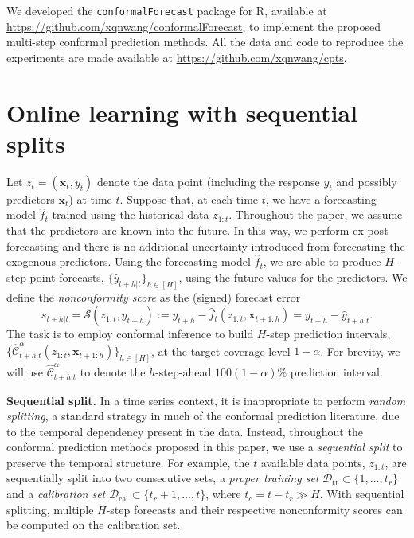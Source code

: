 \documentclass[
  11pt,
  a4paper,
]{article}
\theoremstyle{plain}
\theoremstyle{remark}
\begin{document}
We developed the \texttt{conformalForecast} package for R, available at
\url{https://github.com/xqnwang/conformalForecast}, to implement the
proposed multi-step conformal prediction methods. All the data and code
to reproduce the experiments are made available at
\url{https://github.com/xqnwang/cpts}.

\section{Online learning with sequential splits}\label{sec-setup}

Let \(z_t = (\bm{x}_t, y_t)\) denote the data point (including the
response \(y_t\) and possibly predictors \(\bm{x}_t\)) at time \(t\).
Suppose that, at each time \(t\), we have a forecasting model
\(\hat{f}_t\) trained using the historical data \(z_{1:t}\). Throughout
the paper, we assume that the predictors are known into the future. In
this way, we perform ex-post forecasting and there is no additional
uncertainty introduced from forecasting the exogenous predictors. Using
the forecasting model \(\hat{f}_t\), we are able to produce \(H\)-step
point forecasts, \(\{\hat{y}_{t+h|t}\}_{h\in[H]}\), using the future
values for the predictors. We define the \emph{nonconformity score} as
the (signed) forecast error \[
s_{t+h|t}=\mathcal{S}\left(z_{1:t}, y_{t+h}\right):=y_{t+h}-\hat{f}_t\left(z_{1:t},\bm{x}_{t+1:h}\right)=y_{t+h}-\hat{y}_{t+h|t}.
\] The task is to employ conformal inference to build \(H\)-step
prediction intervals,
\(\{\hat{\mathcal{C}}_{t+h|t}^{\alpha}\left(z_{1:t},\bm{x}_{t+1:h}\right)\}_{h\in[H]}\),
at the target coverage level \(1-\alpha\). For brevity, we will use
\(\hat{\mathcal{C}}_{t+h|t}^{\alpha}\) to denote the \(h\)-step-ahead
\(100(1-\alpha)\%\) prediction interval.

\textbf{Sequential split.} In a time series context, it is inappropriate
to perform \emph{random splitting}, a standard strategy in much of the
conformal prediction literature, due to the temporal dependency present
in the data. Instead, throughout the conformal prediction methods
proposed in this paper, we use a \emph{sequential split} to preserve the
temporal structure. For example, the \(t\) available data points,
\(z_{1:t}\), are sequentially split into two consecutive sets, a
\emph{proper training set}
\(\mathcal{D}_{\text{tr}} \subset \{1,\ldots,t_r\}\) and a
\emph{calibration set}
\(\mathcal{D}_{\text{cal}} \subset \{t_r+1,\ldots,t\}\), where
\(t_c=t-t_r \gg H\). With sequential splitting, multiple \(H\)-step
forecasts and their respective nonconformity scores can be computed on
the calibration set.
\end{document}
